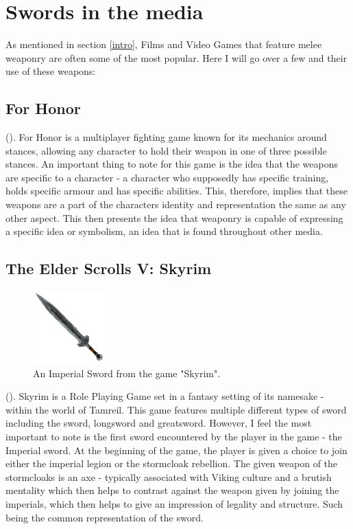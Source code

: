 \documentclass{article}
\begin{document}
\pagebreak

\section{Swords in the media} \label{media}
As mentioned in section \ref{intro}, Films and Video Games that feature melee weaponry are often some of the most popular. Here I will go over a few and their use of these weapons:

\subsection{For Honor}
().
For Honor is a multiplayer fighting game known for its mechanics around stances, allowing any character to hold their weapon in one of three possible stances. An important thing to note for this game is the idea that the weapons are specific to a character - a character who supposedly has specific training, holds specific armour and has specific abilities. This, therefore, implies that these weapons are a part of the characters identity and representation the same as any other aspect. This then presents the idea that weaponry is capable of expressing a specific idea or symbolism, an idea that is found throughout other media.

\subsection{The Elder Scrolls V: Skyrim}
\begin{figure}
    \centering
    \includegraphics[width=0.25\textwidth]{ImperialSword.png}
    \caption{\parencite{imperialSword} An Imperial Sword from the game "Skyrim".
    }
    \label{fig:ImperialSword}
\end{figure}
().
Skyrim is a Role Playing Game set in a fantasy setting of its namesake - within the world of Tamreil. This game features multiple different types of sword including the sword, longsword and greatsword. However, I feel the most important to note is the first sword encountered by the player in the game - the Imperial sword. At the beginning of the game, the player is given a choice to join either the imperial legion or the stormcloak rebellion. The given weapon of the stormcloaks is an axe - typically associated with Viking culture and a brutish mentality which then helps to contrast against the weapon given by joining the imperials, which then helps to give an impression of legality and structure. Such being the common representation of the sword.
\end{document}

